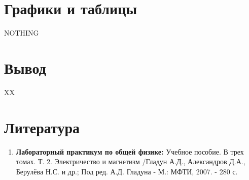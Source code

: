 \documentclass[a4paper, 12pt]{article}%
\begin{document}
\section{Графики и таблицы}

NOTHING

\section{Вывод}

XX

\section{Литература}

\begin{enumerate}
\item \textbf{Лабораторный практикум по общей физике:} Учебное пособие. В трех томах. Т. 2. Электричество и магнетизм /Гладун А.Д., Александров Д.А., Берулёва Н.С. и др.; Под ред. А.Д. Гладуна - М.: МФТИ, 2007. - 280 с.
\end{enumerate}		
		
\end{document}
